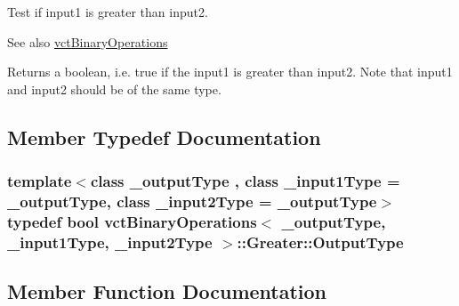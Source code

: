 Test if input1 is greater than input2. 

\begin{DoxySeeAlso}{See also}
\hyperlink{classvct_binary_operations}{vct\+Binary\+Operations}
\end{DoxySeeAlso}
Returns a boolean, i.\+e. true if the input1 is greater than input2. Note that input1 and input2 should be of the same type. 

\subsection{Member Typedef Documentation}
\hypertarget{classvct_binary_operations_1_1_greater_ac6bbb1b038cdd55bc5fda5b024404ebe}{}
\subsubsection[{Output\+Type}]{\setlength{\rightskip}{0pt plus 5cm}template$<$class \+\_\+output\+Type , class \+\_\+input1\+Type  = \+\_\+output\+Type, class \+\_\+input2\+Type  = \+\_\+output\+Type$>$ typedef bool {\bf vct\+Binary\+Operations}$<$ \+\_\+output\+Type, \+\_\+input1\+Type, \+\_\+input2\+Type $>$\+::{\bf Greater\+::\+Output\+Type}}\label{classvct_binary_operations_1_1_greater_ac6bbb1b038cdd55bc5fda5b024404ebe}


\subsection{Member Function Documentation}
\hypertarget{classvct_binary_operations_1_1_greater_ab901e65f312b9e551df7b57a25e3503d}{}
